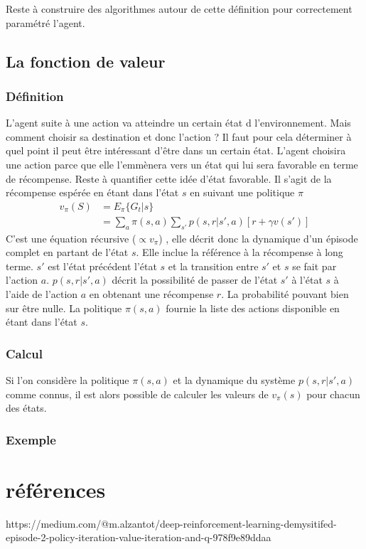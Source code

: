 \documentclass[11pt]{article} %
\begin{document}
Reste à construire des algorithmes autour de cette définition pour correctement paramétré l'agent.

\subsection{La fonction de valeur}
\subsubsection{Définition}
L'agent suite à une action va atteindre un certain état d l'environnement. Mais comment choisir sa destination et donc l'action ? Il faut pour cela déterminer à quel point il peut être intéressant d'être dans un certain état. 
L'agent choisira une action parce que elle l'emmènera vers un état qui lui sera favorable en terme de récompense.
Reste à quantifier cette idée d'état favorable. Il s'agit de la récompense espérée en étant dans l'état $s$ en suivant une politique $\pi$
\begin{align}
v_\pi (S) &= E_\pi \{G_t |s\} \\
		&= \sum_{a} \pi(s,a) \sum_{s'}p(s,r|s',a)[r+ \gamma v(s')]
\end{align}
C'est une équation récursive ($\propto v_\pi$) , elle décrit donc la dynamique d'un épisode complet en partant de l'état $s$. Elle inclue la référence à la récompense à long terme. $s'$ est l'état précédent l'état $s$ et la transition entre $s'$ et $s$ se fait par l'action $a$.
$p(s,r|s',a)$ décrit la possibilité de passer de l'état $s'$ à l'état $s$ à l'aide de l'action $a$ en obtenant une récompense $r$. La probabilité pouvant bien sur être nulle. La politique $\pi(s,a)$ fournie la liste des actions disponible en étant dans l'état $s$.  

\subsubsection{Calcul}
Si l'on considère la politique $\pi(s,a)$ et la dynamique du système $p(s,r|s',a)$ comme connus, il est alors possible de calculer les valeurs de $v_\pi(s)$ pour chacun des états.
\subsubsection{Exemple}
\section{références}
https://medium.com/@m.alzantot/deep-reinforcement-learning-demysitifed-episode-2-policy-iteration-value-iteration-and-q-978f9e89ddaa
\end{document}
